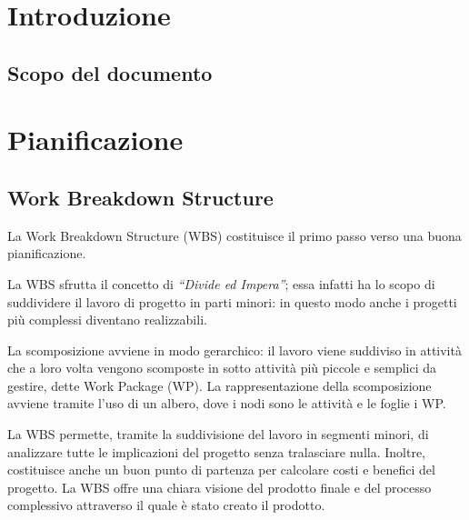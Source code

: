 \newcommand{\sharedPath}{../shared}
\newcommand{\doctitle}{Piano di Progetto}











\section{Introduzione}


\subsection{Scopo del documento}


\section{Pianificazione}
\subsection{Work Breakdown Structure}

La Work Breakdown Structure (WBS) costituisce il primo passo verso una buona pianificazione.

La WBS sfrutta il concetto di \textit{``Divide ed Impera''}; essa infatti ha lo scopo di suddividere il lavoro di progetto in parti minori: in questo modo anche i progetti più complessi diventano realizzabili.

La scomposizione avviene in modo gerarchico: il lavoro viene suddiviso in attività che a loro volta vengono scomposte in sotto attività più piccole e semplici da gestire, dette Work Package (WP).
La rappresentazione della scomposizione avviene tramite l'uso di un albero, dove i nodi sono le attività e le foglie i WP.

La WBS permette, tramite la suddivisione del lavoro in segmenti minori, di analizzare tutte le implicazioni del progetto senza tralasciare nulla. Inoltre, costituisce anche un buon punto di partenza per calcolare costi e benefici del progetto.
La WBS offre una chiara visione del prodotto finale e del processo complessivo attraverso il quale è stato creato il prodotto.


